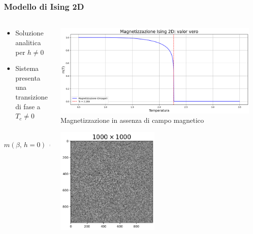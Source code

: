 \begin{frame}
    \frametitle{Modello di Ising 2D}
    \framesubtitle{}

    \begin{columns}

        \begin{column}{0.55\textwidth}

			\begin{itemize}[itemsep=0.5em, label=$\diamond$]
                \item Soluzione analitica per $h \neq 0$
                \item Sistema presenta una transizione di fase a $T_c \neq 0$
            \end{itemize}

			\begin{equation*}
				m\left(\beta,\,h=0\right)\,=\,
				\begin{cases}
				\left[1\,-\,\dfrac{1}{\sinh^4{\left(2\beta J\right)}}\right]^{\frac{1}{8}}\,\, T\,<\,T_c \\
				0 \qquad \qquad \qquad \qquad \,\,\,\, T\,>\,T_c
				\end{cases}
				\label{eq: magn_Ising2D_AS}
			\end{equation*}

        \end{column}


        \begin{column}{0.45\textwidth}
			
			\centering
            \includegraphics[width=\textwidth]{Immagini/Introduzione/magn_Ising2D.png}
            {\scriptsize Magnetizzazione in assenza di campo magnetico}
			
			\centering
            \includegraphics[width=0.5\textwidth]{Immagini/Introduzione/cg_1000_3.0.png}


\end{column}
\end{columns}
\end{frame}
